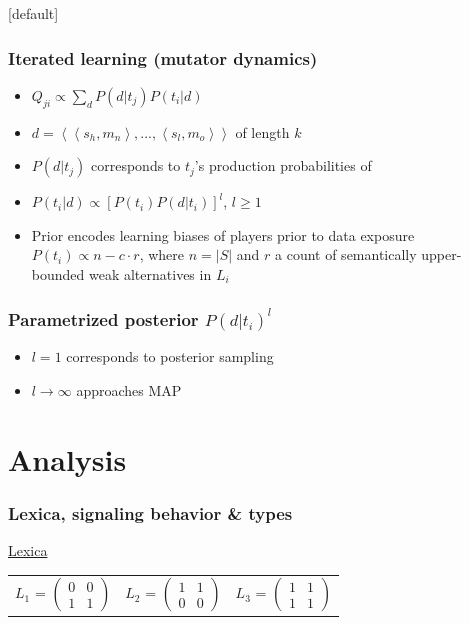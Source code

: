 \documentclass{beamer} %
\makeatletter
\newcommand{\tuple}[1]{\ensuremath{\left\langle #1 \right\rangle}}
\newenvironment{withoutheadline}{
        \setbeamertemplate{headline}[default]
        \def\beamer@entrycode{\vspace*{-\headheight}}
    }{}
\makeatother
\begin{document}
\begin{withoutheadline}
\begin{frame}
	\frametitle{Iterated learning (mutator dynamics)}
\begin{itemize} \itemsep1em
		\item $Q_{ji} \propto \sum_d P(d|t_j)P(t_i|d)$
		\item $d = \tuple{\tuple{s_h,m_n}, ..., \tuple{s_l,m_o}}$ of length $k$
		\item $P(d|t_j)$ corresponds to $t_j$'s production probabilities of
		\item $P(t_i|d) \propto [P(t_i)P(d|t_i)]^l$, $l \geq 1$
		\item Prior encodes learning biases of players prior to data exposure\\[0,3cm]
		      $P(t_i) \propto n - c \cdot r$, where $n = |S|$ and $r$ a count of semantically upper-bounded weak alternatives in $L_i$
\end{itemize}
\end{frame}

\begin{frame}
	\frametitle{Parametrized posterior $P(d|t_i)^l$}
\begin{itemize}\itemsep2em
	  \item $l = 1$ corresponds to posterior sampling
	  \item $l \to \infty$ approaches MAP
	\end{itemize}
\end{frame}


\section{Analysis}



\begin{frame}
	\frametitle{Lexica, signaling behavior \& types}
\underline{Lexica}
\begin{table}
\centering 
\begin{tabular}{l c l}
$L_1$ = $\begin{pmatrix} 0 & 0 \\ 1 & 1 \end{pmatrix}$ & 
$L_2$ = $\begin{pmatrix} 1 & 1 \\ 0 & 0 \end{pmatrix}$ & 
$L_3$ = $\begin{pmatrix} 1 & 1 \\ 1 & 1 \end{pmatrix}$\\[1cm]


\end{tabular}
\end{table}
\end{frame}
\end{withoutheadline}
\end{document}
